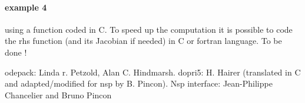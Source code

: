 \begin{examples}
\paragraph{example 4} using a function coded in C. To speed up the computation it is possible to code the rhs
function (and its Jacobian if needed) in C or fortran language. To be done !


\end{examples}

\begin{manseealso}
\end{manseealso}

\begin{authors}
 odepack: Linda r. Petzold, Alan C. Hindmarsh. dopri5: H. Hairer (translated in C and adapted/modified
for nsp by B. Pincon).  Nsp interface: Jean-Philippe Chancelier and Bruno Pincon
\end{authors}
